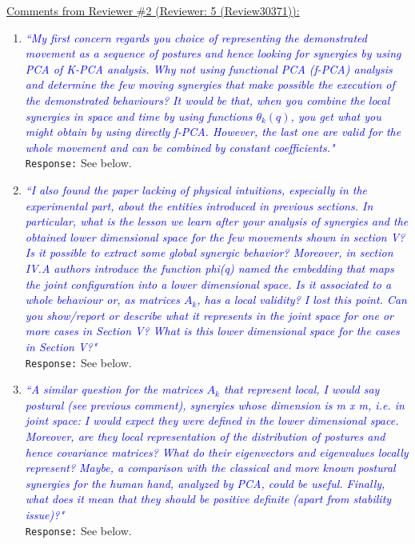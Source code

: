 \documentclass{article}
\begin{document}
\newpage 
\underline{Comments from Reviewer \#2 (Reviewer: 5 (Review30371)):}
\begin{enumerate}
\item \textcolor{blue}{\textit{``My first concern regards you choice of representing the demonstrated
movement as a sequence of postures and hence looking for synergies by
using PCA of K-PCA analysis. Why not using functional PCA (f-PCA)
analysis and determine the few moving synergies that make possible the
execution of the demonstrated behaviours? It would be that, when you
combine the local synergies in space and time by using functions
$\theta_k(q)$, you get what you might obtain by using directly f-PCA.
However, the last one are valid for the whole movement and can be
combined by constant coefficients."}}\\
\texttt{Response:}  See below.

\item \textcolor{blue}{\textit{``I also found the paper lacking of physical intuitions, especially in	the experimental part, about the entities introduced in previous sections. In particular, what is the lesson we learn after your analysis of synergies and the obtained lower dimensional space for the few movements shown in section V? Is it possible to extract some global	synergic behavior? Moreover, in section IV.A authors introduce the function phi(q) named the embedding that maps the joint configuration into a lower dimensional space. Is it associated to a whole behaviour or, as matrices $A_k$, has a local validity? I lost this point. Can you show/report or describe what it represents in the joint space for one or more cases in Section V? What is this lower dimensional space for the cases in Section V?"}}\\
\texttt{Response:}  See below.		

\item \textcolor{blue}{\textit{``A similar question for the matrices $A_k$ that represent local, I
	would say postural (see previous comment), synergies whose dimension is
	m x m, i.e. in joint space: I would expect they were defined in the
	lower dimensional space. Moreover, are they local representation of the
	distribution of postures and hence covariance matrices? What do their
	eigenvectors and eigenvalues locally represent? Maybe, a comparison
	with the classical and more known postural synergies for the human
	hand, analyzed by PCA, could be useful. Finally, what does it mean that
	they should be positive definite (apart from stability issue)?"}}\\
\texttt{Response:}  See below.\\


\end{enumerate}
\end{document}
